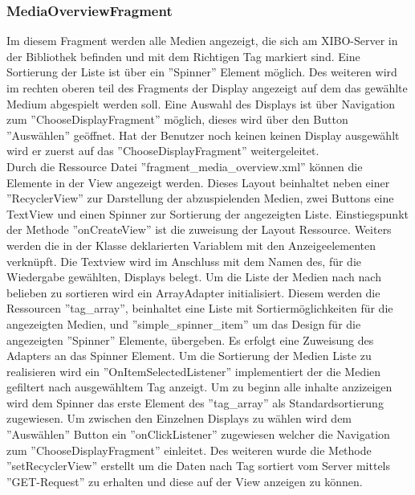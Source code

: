 \subsubsection{MediaOverviewFragment}
Im diesem Fragment werden alle Medien angezeigt, die sich am XIBO-Server in der Bibliothek befinden und mit dem Richtigen Tag markiert sind. Eine Sortierung der Liste ist über ein ''Spinner'' Element möglich. Des weiteren wird im rechten oberen teil des Fragments der Display angezeigt auf dem das gewählte Medium abgespielt werden soll. Eine Auswahl des Displays ist über Navigation zum ''ChooseDisplayFragment'' möglich, dieses wird über den Button ''Auswählen'' geöffnet. Hat der Benutzer noch keinen keinen Display ausgewählt wird er zuerst auf das ''ChooseDisplayFragment'' weitergeleitet.
\\
Durch die Ressource Datei ''fragment\_media\_overview.xml'' können die Elemente in der View angezeigt werden. Dieses Layout beinhaltet neben einer ''RecyclerView'' zur Darstellung der abzuspielenden Medien, zwei Buttons eine TextView und einen Spinner zur Sortierung der angezeigten Liste. Einstiegspunkt der Methode ''onCreateView'' ist die zuweisung der Layout Ressource. Weiters werden die in der Klasse deklarierten Variablem mit den Anzeigeelementen verknüpft. Die Textview wird im Anschluss mit dem Namen des, für die Wiedergabe gewählten, Displays belegt. Um die Liste der Medien nach nach belieben zu sortieren wird ein ArrayAdapter initialisiert. Diesem werden die Ressourcen ''tag\_array'', beinhaltet eine Liste mit Sortiermöglichkeiten für die angezeigten Medien, und ''simple\_spinner\_item'' um das Design für die angezeigten ''Spinner'' Elemente, übergeben. Es erfolgt eine Zuweisung des Adapters an das Spinner Element. Um die Sortierung der Medien Liste zu realisieren wird ein ''OnItemSelectedListener'' implementiert der die Medien gefiltert nach ausgewähltem Tag anzeigt. Um zu beginn alle inhalte anzizeigen wird dem Spinner das erste Element des ''tag\_array'' als Standardsortierung zugewiesen. Um zwischen den Einzelnen Displays zu wählen wird dem ''Auswählen'' Button ein ''onClickListener'' zugewiesen welcher die Navigation zum ''ChooseDisplayFragment'' einleitet. Des weiteren wurde die Methode ''setRecyclerView'' erstellt um die Daten nach Tag sortiert vom Server mittels ''GET-Request'' zu erhalten und diese auf der View anzeigen zu können.
